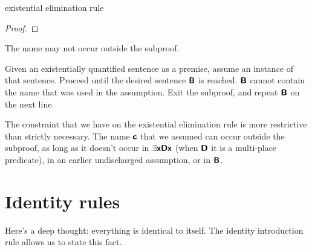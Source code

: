 \begin{factboxy}{existential elimination rule}
\begin{proof}
	\open
		 \as{}
	\close
	 
\end{proof}

\small{The name  may not occur outside the subproof.\smallskip

Given an existentially quantified sentence as a premise, assume an instance of that sentence. Proceed until the desired sentence $\bm{\mathsf{B}}$ is reached. $\bm{\mathsf{B}}$ cannot contain the name that was used in the assumption. Exit the subproof, and repeat $\bm{\mathsf{B}}$ on the next line.
}
\end{factboxy}



\begin{notebox}
The constraint that we have on the existential elimination rule is more restrictive than strictly necessary. The name $\bm{\mathsf{c}}$ that we assumed can occur outside the subproof, as long as it doesn't occur in $\exists \bm{\mathsf{x}}\bm{\mathsf{Dx}}$ (when $\bm{\mathsf{D}}$ it is a multi-place predicate), in an earlier undischarged assumption, or in $\bm{\mathsf{B}}$.
\end{notebox}


\section{Identity rules}

Here's a deep thought: everything is identical to itself. The {identity introduction rule} allows us to state this fact.

